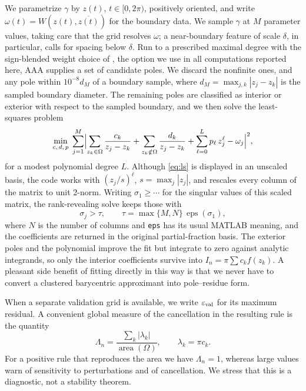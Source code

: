 \documentclass[onefignum,onetabnum]{siamart220329}
\newcommand{\eps}{\varepsilon}
\begin{document}
We parametrize $\gamma$ by $z(t)$, $t \in [0, 2\pi)$, positively
oriented, and write $\omega(t)=W(z(t),\overline{z(t)})$ for the boundary
data. We sample $\gamma$ at $M$ parameter values, taking care that the
grid resolves $\omega$; a near-boundary feature of scale $\delta$, in
particular, calls for spacing below $\delta$. Run to a prescribed
maximal degree with the sign-blended weight choice of
\cite{TrefethenWilber2025}, the option we use in all computations
reported here, AAA supplies a set of candidate poles. We discard the
nonfinite ones, and any pole within $10^{-8}d_M$ of a boundary sample,
where $d_M=\max_{j,k}|z_j-z_k|$ is the sampled boundary diameter. The
remaining poles are classified as interior or exterior with respect to
the sampled boundary, and we then solve the least-squares problem
\begin{equation}
\label{eq:ls}
\min_{c,\, d,\, p}\;
\sum_{j=1}^{M} \Bigl|
\sum_{z_k \in \Omega} \frac{c_k}{z_j - z_k}
+ \sum_{z_k \notin \Omega} \frac{d_k}{z_j - z_k}
+ \sum_{\ell=0}^{L} p_\ell\, z_j^\ell
- \omega_j \Bigr|^2 ,
\end{equation}
for a modest polynomial degree $L$. Although \eqref{eq:ls} is displayed
in an unscaled basis, the code works with $(z_j/s)^\ell$,
$s=\max_j|z_j|$, and rescales every column of the matrix to unit
2-norm. Writing $\sigma_1\geq\cdots$ for the singular values of this
scaled matrix, the rank-revealing solve keeps those with
\[
  \sigma_j>\tau, \qquad
  \tau=\max\{M,N\}\,\operatorname{eps}(\sigma_1),
\]
where $N$ is the number of columns and \texttt{eps} has its usual
MATLAB meaning, and the coefficients are returned in the original
partial-fraction basis. The exterior poles and the polynomial improve
the fit but integrate to zero against analytic integrands, so only the
interior coefficients survive into $I_n=\pi\sum c_kf(z_k)$. A pleasant
side benefit of fitting directly in this way is that we never have to
convert a clustered barycentric approximant into pole--residue form.

When a separate validation grid is available, we write $\eps_{\rm val}$
for its maximum residual. A convenient global measure of the
cancellation in the resulting rule is the quantity
\[
  \Lambda_n=\frac{\sum_k|\lambda_k|}
                   {\operatorname{area}(\Omega)},
  \qquad \lambda_k=\pi c_k.
\]
For a positive rule that reproduces the area we have $\Lambda_n=1$,
whereas large values warn of sensitivity to perturbations and of
cancellation. We stress that this is a diagnostic, not a stability
theorem.
\end{document}
